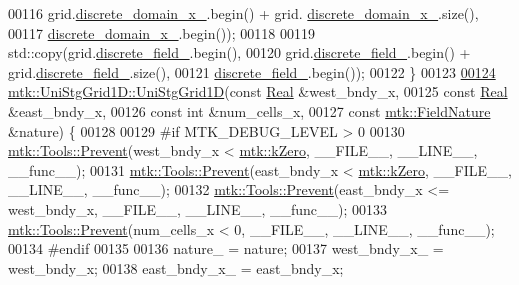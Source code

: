 \begin{DoxyCode}
00116               grid.\hyperlink{classmtk_1_1UniStgGrid1D_a0a1f9c00e21659e05f414dd97e2a52e3}{discrete\_domain\_x\_}.begin() + grid.
      \hyperlink{classmtk_1_1UniStgGrid1D_a0a1f9c00e21659e05f414dd97e2a52e3}{discrete\_domain\_x\_}.size(),
00117               \hyperlink{classmtk_1_1UniStgGrid1D_a0a1f9c00e21659e05f414dd97e2a52e3}{discrete\_domain\_x\_}.begin());
00118 
00119     std::copy(grid.\hyperlink{classmtk_1_1UniStgGrid1D_a7379a5c6d16210cdd61ffa731bc47edc}{discrete\_field\_}.begin(),
00120               grid.\hyperlink{classmtk_1_1UniStgGrid1D_a7379a5c6d16210cdd61ffa731bc47edc}{discrete\_field\_}.begin() + grid.\hyperlink{classmtk_1_1UniStgGrid1D_a7379a5c6d16210cdd61ffa731bc47edc}{discrete\_field\_}.size(),
00121               \hyperlink{classmtk_1_1UniStgGrid1D_a7379a5c6d16210cdd61ffa731bc47edc}{discrete\_field\_}.begin());
00122 \}
00123 
\hypertarget{mtk__uni__stg__grid__1d_8cc_source_l00124}{}\hyperlink{classmtk_1_1UniStgGrid1D_ae19250f0cddef7a05c4a73a90991a26a}{00124} \hyperlink{classmtk_1_1UniStgGrid1D_ab0c1bb8afad2420fdb4434eb21bdec82}{mtk::UniStgGrid1D::UniStgGrid1D}(\textcolor{keyword}{const} \hyperlink{group__c01-roots_gac080bbbf5cbb5502c9f00405f894857d}{Real} &west\_bndy\_x,
00125                                 \textcolor{keyword}{const} \hyperlink{group__c01-roots_gac080bbbf5cbb5502c9f00405f894857d}{Real} &east\_bndy\_x,
00126                                 \textcolor{keyword}{const} \textcolor{keywordtype}{int} &num\_cells\_x,
00127                                 \textcolor{keyword}{const} \hyperlink{group__c02-enums_ga4c54f2a329cfb4e56213b02a259d19e2}{mtk::FieldNature} &nature) \{
00128 
00129 \textcolor{preprocessor}{  #if MTK\_DEBUG\_LEVEL > 0}
00130   \hyperlink{classmtk_1_1Tools_a332324c6f25e66be9dff48c5987a3b9f}{mtk::Tools::Prevent}(west\_bndy\_x < \hyperlink{group__c01-roots_ga59a451a5fae30d59649bcda274fea271}{mtk::kZero}, \_\_FILE\_\_, \_\_LINE\_\_, \_\_func\_\_);
00131   \hyperlink{classmtk_1_1Tools_a332324c6f25e66be9dff48c5987a3b9f}{mtk::Tools::Prevent}(east\_bndy\_x < \hyperlink{group__c01-roots_ga59a451a5fae30d59649bcda274fea271}{mtk::kZero}, \_\_FILE\_\_, \_\_LINE\_\_, \_\_func\_\_);
00132   \hyperlink{classmtk_1_1Tools_a332324c6f25e66be9dff48c5987a3b9f}{mtk::Tools::Prevent}(east\_bndy\_x <= west\_bndy\_x, \_\_FILE\_\_, \_\_LINE\_\_, \_\_func\_\_);
00133   \hyperlink{classmtk_1_1Tools_a332324c6f25e66be9dff48c5987a3b9f}{mtk::Tools::Prevent}(num\_cells\_x < 0, \_\_FILE\_\_, \_\_LINE\_\_, \_\_func\_\_);
00134 \textcolor{preprocessor}{  #endif}
00135 
00136   nature\_ = nature;
00137   west\_bndy\_x\_ = west\_bndy\_x;
00138   east\_bndy\_x\_ = east\_bndy\_x;

\end{DoxyCode}
